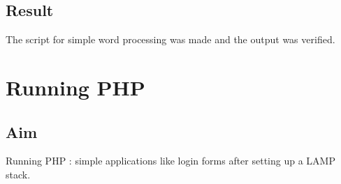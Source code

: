 \documentclass{article}
\begin{document}
\subsection{Result}
The script for simple word processing was made and the output was verified.

\begin{refsection}
\cite{perlbook}
\cite{perlweb}
\printbibliography
\end{refsection}

\newpage
\section{Running PHP}

\subsection{Aim}
Running PHP : simple applications like login forms after setting up a LAMP stack.
\end{document}

